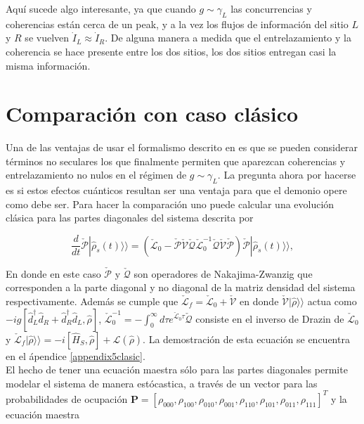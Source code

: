 
Aquí sucede algo interesante, ya que cuando $g\sim \gamma_{L}$ las concurrencias y coherencias están cerca de un peak, y a la vez los flujos de información del sitio $L$ y $R$ se vuelven $\dot{I}_{L} \approx \dot{I}_{R}$. De alguna manera a medida que el entrelazamiento y la coherencia se hace presente entre los dos sitios, los dos sitios entregan casi la misma información.


\newpage 

\section{Comparación con caso clásico}
Una de las ventajas de usar el formalismo descrito en \cite{prech2023entanglement} es que se pueden considerar términos no seculares los que finalmente permiten que aparezcan coherencias y entrelazamiento no nulos en el régimen de $g\sim \gamma_{L}$. La pregunta ahora por hacerse es si estos efectos cuánticos resultan ser una ventaja para que el demonio opere como debe ser. Para hacer la comparación uno puede calcular una evolución clásica para las partes diagonales del sistema descrita por

\begin{equation}
    \frac{d}{dt}\check{\mathcal{P}}|\hat{\rho}_{s}(t)\rangle \rangle = (\check{\mathcal{L}}_{0} - \check{\mathcal{P}}\check{\mathcal{V}}\check{\mathcal{Q}}\check{\mathcal{L}}^{-1}_{0}\check{\mathcal{Q}}\check{\mathcal{V}}\check{\mathcal{P}})\check{\mathcal{P}}|\hat{\rho}_{s}(t)\rangle \rangle, 
\label{ec5:classicalmodel}
\end{equation}

En donde en este caso $\check{\mathcal{P}}$ y $\check{\mathcal{Q}}$ son operadores de Nakajima-Zwanzig que corresponden a la parte diagonal y no diagonal de la matriz densidad del sistema respectivamente. Además se cumple que $\check{\mathcal{L}}_{f} = \check{\mathcal{L}}_{0} + \check{\mathcal{V}} $ en donde $\check{\mathcal{V}}|\hat{\rho}\rangle \rangle$ actua como $-ig[\hat{d}_{L}^{\dagger}\hat{d}_{R} + \hat{d}_{R}^{\dagger}\hat{d}_{L},\hat{\rho}]$, $\check{\mathcal{L}}_{0}^{-1} = - \int_{0}^{\infty}d\tau e^{\check{\mathcal{L}}_{0} \tau} \check{\mathcal{Q}} $ consiste en el inverso de Drazin de $\check{\mathcal{L}}_{0}$ \cite{landi2024current} y $\check{\mathcal{L}}_{f}|\hat{\rho}\rangle \rangle = -i[\hat{H}_{S},\hat{\rho}] + \mathcal{L}(\hat{\rho})$. La demostración de esta ecuación se encuentra en el ápendice \ref{appendix5clasic}. \\
El hecho de tener una ecuación maestra sólo para las partes diagonales permite modelar el sistema de manera estócastica, a través de un vector para las probabilidades de ocupación $\textbf{P} = [\rho_{000},\rho_{100},\rho_{010},\rho_{001},\rho_{110},\rho_{101},\rho_{011},\rho_{111}]^{T}$ y la ecuación maestra

